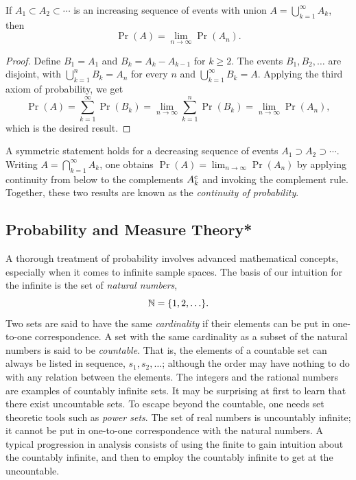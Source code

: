\begin{proposition}
If $A_1 \subset A_2 \subset \cdots$ is an increasing sequence of events with union $A = \bigcup_{k=1}^{\infty} A_k$, then
\begin{equation*}
\Pr (A) = \lim_{n \to \infty} \Pr (A_n) .
\end{equation*}
\end{proposition}
\begin{proof}
Define $B_1 = A_1$ and $B_k = A_k - A_{k-1}$ for $k \geq 2$.
The events $B_1, B_2, \ldots$ are disjoint, with $\bigcup_{k=1}^{n} B_k = A_n$ for every $n$ and $\bigcup_{k=1}^{\infty} B_k = A$.
Applying the third axiom of probability, we get
\begin{equation*}
\Pr (A)
= \sum_{k=1}^{\infty} \Pr (B_k)
= \lim_{n \to \infty} \sum_{k=1}^{n} \Pr (B_k)
= \lim_{n \to \infty} \Pr (A_n) ,
\end{equation*}
which is the desired result.
\end{proof}

A symmetric statement holds for a decreasing sequence of events $A_1 \supset A_2 \supset \cdots$.
Writing $A = \bigcap_{k=1}^{\infty} A_k$, one obtains $\Pr (A) = \lim_{n \to \infty} \Pr (A_n)$ by applying continuity from below to the complements $A_k^{\mathrm{c}}$ and invoking the complement rule.
Together, these two results are known as the \emph{continuity of probability}.


\subsection{Probability and Measure Theory*}

A thorough treatment of probability involves advanced mathematical concepts, especially when it comes to infinite sample spaces.
The basis of our intuition for the infinite is the set of \emph{natural numbers},
\begin{equation*}
\mathbb{N} = \{ 1, 2, \ldots \}.
\end{equation*}
Two sets are said to have the same \emph{cardinality} if their elements can be put in one-to-one correspondence.
A set with the same cardinality as a subset of the natural numbers is said to be \emph{countable}.
That is, the elements of a countable set can always be listed in sequence, $s_1, s_2, \ldots$; although the order may have nothing to do with any relation between the elements.
The integers and the rational numbers are examples of countably infinite sets.
It may be surprising at first to learn that there exist uncountable sets.
To escape beyond the countable, one needs set theoretic tools such as \emph{power sets}.
The set of real numbers is uncountably infinite; it cannot be put in one-to-one correspondence with the natural numbers.
A typical progression in analysis consists of using the finite to gain intuition about the countably infinite, and then to employ the countably infinite to get at the uncountable.

